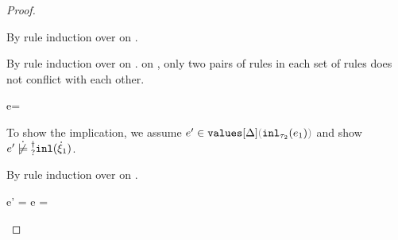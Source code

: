 \begin{proof}
\begin{byCases}
      By rule induction over  on .
      \begin{byCases}
        \item[\text{(\ref{rule:FVal})}]
          \begin{pfsteps}
          \item {}  
          \end{pfsteps}
          By rule induction over  on .
           on , only two pairs of rules in each set
          of rules does not conflict with each other.
          \begin{byCases}
            \item[\text{(\ref{rule:VInl}, \ref{rule:TInl})}]
              \begin{pfsteps}
              \item e= 
              \item {}  
              \item {}  
              \item {}  
              \end{pfsteps}
              To show the implication, we assume $\inValues{e'}{\Delta}{\hinl{\tau_2}{e_1}}$ and show $\cnotsatisfyormay{e'}{\cinl{\hxi_1}}$.
              \begin{pfsteps}
              \item {}  
              \end{pfsteps}
              By rule induction over  on .
              \begin{byCases}
                \item[\text{(\ref{rule:IVVal})}]
                \begin{pfsteps}
                \item e' = e =  
                \item {} 
                \end{pfsteps}


\end{byCases}
\end{byCases}
\end{byCases}
\end{byCases}
\end{proof}
